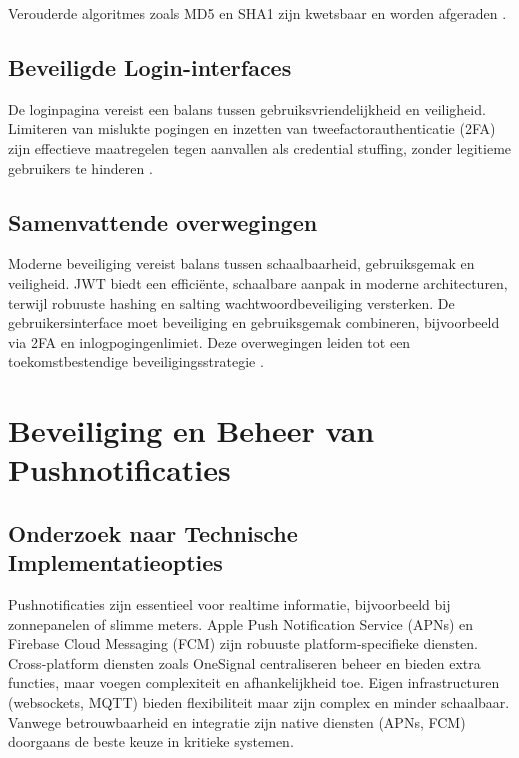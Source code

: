 Verouderde algoritmes zoals MD5 en SHA1 zijn kwetsbaar en worden afgeraden \autocite{ReesCarter2024}.

\subsection{Beveiligde Login-interfaces}
De loginpagina vereist een balans tussen gebruiksvriendelijkheid en veiligheid. Limiteren van mislukte pogingen en inzetten van tweefactorauthenticatie (2FA) zijn effectieve maatregelen tegen aanvallen als credential stuffing, zonder legitieme gebruikers te hinderen \autocite{Chinnasamy2025, Jurisons2024}.

\subsection{Samenvattende overwegingen}
Moderne beveiliging vereist balans tussen schaalbaarheid, gebruiksgemak en veiligheid. JWT biedt een efficiënte, schaalbare aanpak in moderne architecturen, terwijl robuuste hashing en salting wachtwoordbeveiliging versterken. De gebruikersinterface moet beveiliging en gebruiksgemak combineren, bijvoorbeeld via 2FA en inlogpogingenlimiet. Deze overwegingen leiden tot een toekomstbestendige beveiligingsstrategie \autocite{Gao2023, Gupta2022, Arias2025, ReesCarter2024, Chinnasamy2025, Jurisons2024}.

\section{Beveiliging en Beheer van Pushnotificaties}

\subsection{Onderzoek naar Technische Implementatieopties}
Pushnotificaties zijn essentieel voor realtime informatie, bijvoorbeeld bij zonnepanelen of slimme meters. Apple Push Notification Service (APNs) en Firebase Cloud Messaging (FCM) zijn robuuste platform-specifieke diensten.\\

Cross-platform diensten zoals OneSignal centraliseren beheer en bieden extra functies, maar voegen complexiteit en afhankelijkheid toe. Eigen infrastructuren (websockets, MQTT) bieden flexibiliteit maar zijn complex en minder schaalbaar.\\

Vanwege betrouwbaarheid en integratie zijn native diensten (APNs, FCM) doorgaans de beste keuze in kritieke systemen.

